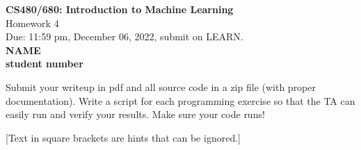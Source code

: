 \documentclass[10pt]{article}
\newcommand{\red}[1]{{\color{red}#1}}
\newcommand{\green}[1]{{\color{green}#1}}
\begin{document}
	
	\begin{center}
		\large{\textbf{CS480/680: Introduction to Machine Learning} \\ Homework 4\\ \red{Due: 11:59 pm, December 06, 2022}, \red{submit on LEARN}.} \\
		
		{\bf \green{NAME}} \\
		{\bf \green{student number}}
		
	\end{center}
	
	\begin{center}
		Submit your writeup in pdf and all source code in a zip file (with proper documentation). Write a script for each programming exercise so that the TA can easily run and verify your results. Make sure your code runs!
		
		[Text in square brackets are hints that can be ignored.]
	\end{center}
\end{document}

